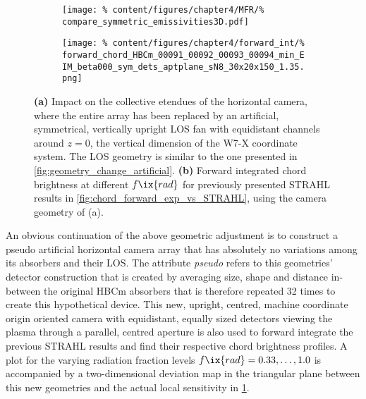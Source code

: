             \begin{figure}[t]%
                \centering%
                \begin{subfigure}{0.47\textwidth}%
                    \texttt{[image: \%
                        content/figures/chapter4/MFR/\%
                        compare\_symmetric\_emissivities3D.pdf]}%
                    \caption{}%
                \end{subfigure}%
                \hfill%
                \begin{subfigure}{0.47\textwidth}%
                    \texttt{[image: \%
                        content/figures/chapter4/forward\_int/\%
                        forward\_chord\_HBCm\_00091\_00092\_00093\_00094\_min\_EIM\_beta000\_sym\_dets\_aptplane\_sN8\_30x20x150\_1.35.png]}%
                    \caption{}%
                \end{subfigure}%
                \caption{\textbf{(a)} Impact on the collective etendues of the horizontal camera, where the entire array has been replaced by an artificial, symmetrical, vertically upright LOS fan with equidistant channels around $z=0$, the vertical dimension of the W7-X coordinate system. The LOS geometry is similar to the one presented in \cref{fig:geometry_change_artificial}. \textbf{(b)} Forward integrated chord brightness at different $f\ix{rad}$ for previously presented STRAHL results in \cref{fig:chord_forward_exp_vs_STRAHL}, using the camera geometry of (a).}\label{fig:geometry_forward_symmetric}%
            \end{figure}%
%
            An obvious continuation of the above geometric adjustment is to construct a pseudo artificial horizontal camera array that has absolutely no variations among its absorbers and their LOS. The attribute \textit{pseudo} refers to this geometries' detector construction that is created by averaging size, shape and distance in-between the original HBCm absorbers that is therefore repeated 32 times to create this hypothetical device. This new, upright, centred, machine coordinate origin oriented camera with equidistant, equally sized detectors viewing the plasma through a parallel, centred aperture is also used to forward integrate the previous STRAHL results and find their respective chord brightness profiles. A plot for the varying radiation fraction levels $f\ix{rad}=0.33,\dots,1.0$ is accompanied by a two-dimensional deviation map in the triangular plane between this new geometries and the actual local sensitivity in \cref{fig:geometry_forward_symmetric}.\\%
